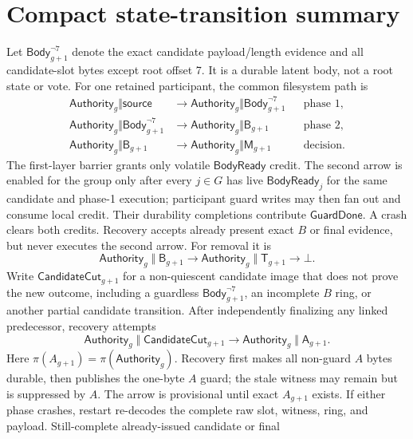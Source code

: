 \documentclass[10pt,twocolumn]{article}
\theoremstyle{remark}
\newcommand{\absent}{\bot}
\newcommand{\Prepared}{\mathsf{B}}
\newcommand{\Materialized}{\mathsf{M}}
\newcommand{\Tombstone}{\mathsf{T}}
\newcommand{\Abort}{\mathsf{A}}
\begin{document}
\appendix

\section{Compact state-transition summary}

Let $\mathsf{Body}^{\neg 7}_{g+1}$ denote the exact candidate payload/length evidence and all
candidate-slot bytes except root offset 7. It is a durable latent body, not a root state or vote.
For one retained participant, the common filesystem path is
\[
\begin{aligned}
  \mathsf{Authority}_g \Vert \mathsf{source}
    &\longrightarrow \mathsf{Authority}_g \Vert \mathsf{Body}^{\neg 7}_{g+1}
      &&\text{phase 1},\\
  \mathsf{Authority}_g \Vert \mathsf{Body}^{\neg 7}_{g+1}
    &\longrightarrow \mathsf{Authority}_g \Vert \Prepared_{g+1}
      &&\text{phase 2},\\
  \mathsf{Authority}_g \Vert \Prepared_{g+1}
    &\longrightarrow \mathsf{Authority}_g \Vert \Materialized_{g+1}
      &&\text{decision.}
\end{aligned}
\]
The first-layer barrier grants only volatile $\mathsf{BodyReady}$ credit. The second arrow is
enabled for the group only after every $j\in G$ has live $\mathsf{BodyReady}_j$ for the same
candidate and phase-1 execution; participant guard writes may then fan out and consume local
credit. Their durability completions contribute $\mathsf{GuardDone}$. A crash clears both credits.
Recovery accepts already present exact $B$ or final evidence, but never executes the second arrow.
For removal it is
\[
  \mathsf{Authority}_g \;\Vert\; \Prepared_{g+1}
  \longrightarrow
  \mathsf{Authority}_g \;\Vert\; \Tombstone_{g+1}
  \longrightarrow
  \absent.
\]
Write $\mathsf{CandidateCut}_{g+1}$ for a non-quiescent candidate image that does not prove the new
outcome, including a guardless $\mathsf{Body}^{\neg 7}_{g+1}$, an incomplete $B$ ring, or another
partial candidate transition. After independently finalizing any linked predecessor, recovery
attempts
\[
  \mathsf{Authority}_g \;\Vert\; \mathsf{CandidateCut}_{g+1}
  \longrightarrow
  \mathsf{Authority}_g \;\Vert\; \Abort_{g+1}.
\]
Here $\pi(A_{g+1})=\pi(\mathsf{Authority}_g)$. Recovery first makes all non-guard $A$ bytes durable,
then publishes the one-byte $A$ guard; the stale witness may remain but is suppressed by $A$.
The arrow is provisional until exact $A_{g+1}$ exists. If either phase crashes, restart re-decodes
the complete raw slot, witness, ring, and payload. Still-complete already-issued candidate or final
\end{document}
